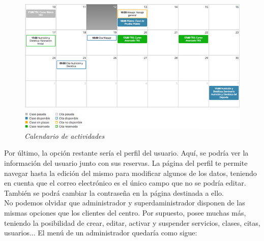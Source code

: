\begin{figure}
\centering
  \includegraphics[scale=.60]{img/manual/calendario.jpg}
  \caption{\textit{Calendario de actividades}}
  \label{fig:calendario}
\end{figure}

Por último, la opción restante sería el perfil del usuario. Aquí, se podría ver la información del usuario junto con sus reservas. La página del perfil te permite navegar hasta la edición del mismo para modificar algunos de los datos, teniendo en cuenta que el correo electrónico es el único campo que no se podría editar. También se podrá cambiar la contraseña en la página destinada a ello.\\

No podemos olvidar que administrador y superdaministrador disponen de las mismas opciones que los clientes del centro. Por supuesto, posee muchas más, teniendo la posibilidad de crear, editar, activar y suspender servicios, clases, citas, usuarios... El menú de un administrador quedaría como sigue:

